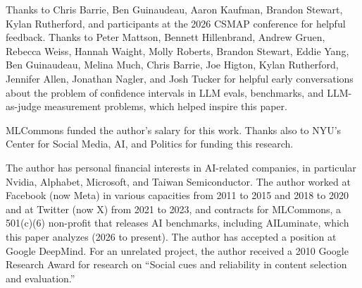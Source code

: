 \documentclass{article}
\begin{document}
\begin{ack}
Thanks to Chris Barrie, Ben Guinaudeau, Aaron Kaufman, Brandon Stewart, Kylan Rutherford, and participants at the 2026 CSMAP conference for helpful feedback. Thanks to Peter Mattson, Bennett Hillenbrand, Andrew Gruen, Rebecca Weiss, Hannah Waight, Molly Roberts, Brandon Stewart, Eddie Yang, Ben Guinaudeau, Melina Much, Chris Barrie, Joe Higton, Kylan Rutherford, Jennifer Allen, Jonathan Nagler, and Josh Tucker for helpful early conversations about the problem of confidence intervals in LLM evals, benchmarks, and LLM-as-judge measurement problems, which helped inspire this paper.

MLCommons funded the author's salary for this work. Thanks also to NYU's Center for Social Media, AI, and Politics for funding this research.

The author has personal financial interests in AI-related companies, in particular Nvidia, Alphabet, Microsoft, and Taiwan Semiconductor. The author worked at Facebook (now Meta) in various capacities from 2011 to 2015 and 2018 to 2020 and at Twitter (now X) from 2021 to 2023, and contracts for MLCommons, a 501(c)(6) non-profit that releases AI benchmarks, including AILuminate, which this paper analyzes (2026 to present). The author has accepted a position at Google DeepMind. For an unrelated project, the author received a 2010 Google Research Award for research on ``Social cues and reliability in content selection and evaluation.''
\end{ack}




\appendix

\end{document}
